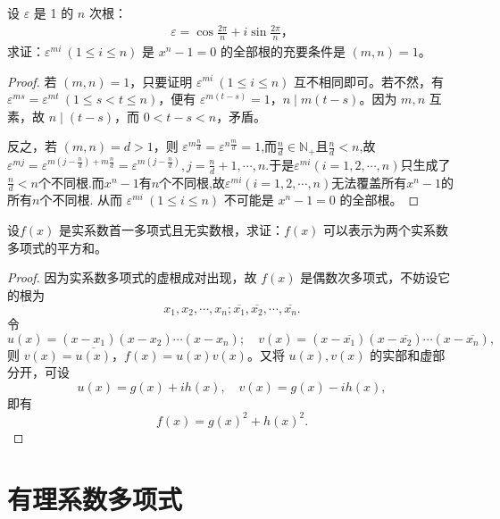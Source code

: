 \documentclass[lang=cn,newtx,10pt,scheme=chinese]{elegantbook}
\begin{document}
\begin{example}
设 $\varepsilon$ 是 1 的 $n$ 次根：
\begin{align*}
\varepsilon = \cos \frac{2\pi}{n} + i \sin \frac{2\pi}{n}，
\end{align*}
求证：$\varepsilon^{mi} \ (1 \leq i \leq n)$ 是 $x^n - 1 = 0$ 的全部根的充要条件是 $(m, n) = 1$。
\end{example}
\begin{proof}
若 $(m, n) = 1$，只要证明 $\varepsilon^{mi} \ (1 \leq i \leq n)$ 互不相同即可。若不然，有 $\varepsilon^{ms} = \varepsilon^{mt} \ (1 \leq s < t \leq n)$，便有 $\varepsilon^{m(t-s)} = 1$，$n \mid m(t-s)$。因为 $m, n$ 互素，故 $n \mid (t-s)$，而 $0 < t-s < n$，矛盾。

反之，若 $(m, n) = d > 1$，则 $\varepsilon^{m \frac{n}{d}} = \varepsilon^{n \frac{m}{d}} = 1$,而$\frac{n}{d}\in \mathbb{N}_+$且$\frac{n}{d}<n$,故$\varepsilon ^{mj}=\varepsilon ^{m\left( j-\frac{n}{d} \right) +m\frac{n}{d}}=\varepsilon ^{m\left( j-\frac{n}{d} \right)},j=\frac{n}{d}+1,\cdots ,n.$于是$\varepsilon ^{mi}\left( i=1,2,\cdots ,n \right) $只生成了$\frac{n}{d}<n$个不同根.而$x^n-1$有$n$个不同根,故$\varepsilon ^{mi}\left( i=1,2,\cdots ,n \right)$无法覆盖所有$x^n-1$的所有$n$个不同根.
从而 $\varepsilon^{mi} \ (1 \leq i \leq n)$ 不可能是 $x^n - 1 = 0$ 的全部根。
\end{proof}

\begin{proposition}
设\( f(x) \) 是实系数首一多项式且无实数根，求证：\( f(x) \) 可以表示为两个实系数多项式的平方和。
\end{proposition}
\begin{proof}
因为实系数多项式的虚根成对出现，故 \( f(x) \) 是偶数次多项式，不妨设它的根为
\[
x_1, x_2, \cdots, x_n; \overline{x_1}, \overline{x_2}, \cdots, \overline{x_n}.
\]
令
\[
u(x) = (x - x_1)(x - x_2) \cdots (x - x_n); \quad v(x) = (x - \overline{x_1})(x - \overline{x_2}) \cdots (x - \overline{x_n}),
\]
则 \( v(x) = \overline{u(x)} \)，\( f(x) = u(x)v(x) \)。又将 \( u(x), v(x) \) 的实部和虚部分开，可设
\[
u(x) = g(x) + ih(x), \quad v(x) = g(x) - ih(x),
\]
即有
\[
f(x) = g(x)^2 + h(x)^2.
\]
\end{proof}



\section{有理系数多项式}
\end{document}
